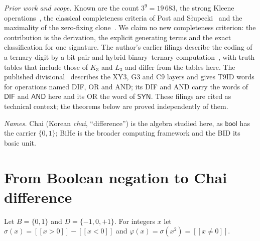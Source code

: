 \documentclass[conference]{IEEEtran}
\newcommand{\D}{D}
\newcommand{\sgn}{\sigma}
\newcommand{\fold}{\varphi}
\newcommand{\SYN}{\mathsf{SYN}}
\newcommand{\DIF}{\mathsf{DIF}}
\newcommand{\AND}{\mathsf{AND}}
\newcommand{\iv}[1]{[\![#1]\!]}
\theoremstyle{remark}
\begin{document}
	\emph{Prior work and scope.} Known are the count $3^9=19\,683$, the strong Kleene operations~\cite{kleene1952}, the classical completeness criteria of Post and S{\l}upecki~\cite{post1921,slupecki1939,slupecki1972} and the maximality of the zero-fixing clone~\cite{rosenberg1970,lau2006}. We claim no new completeness criterion: the contribution is the derivation, the explicit generating terms and the exact classification for one signature. The author's earlier filings describe the coding of a ternary digit by a bit pair and hybrid binary--ternary computation~\cite{caiWOa,caiWO}, with truth tables that include those of $K_3$ and $L_3$ and differ from the tables here. The published divisional~\cite{caiCN} describes the XY3, G3 and C9 layers and gives T9ID words for operations named DIF, OR and AND; its DIF and AND carry the words of $\DIF$ and $\AND$ here and its OR the word of $\SYN$. These filings are cited as technical context; the theorems below are proved independently of them.
	
	\emph{Names.} Chai (Korean \emph{chai}, ``difference'') is the algebra studied here, as $\mathsf{bool}$ has the carrier $\{0,1\}$; BiHe is the broader computing framework and the BID its basic unit.
	
	\section{From Boolean negation to Chai difference}
	Let $B=\{0,1\}$ and $\D=\{-1,0,+1\}$. For integers $x$ let $\sgn(x)=\iv{x>0}-\iv{x<0}$ and $\fold(x)=\sgn(x^2)=\iv{x\ne0}$.
	
\end{document}
